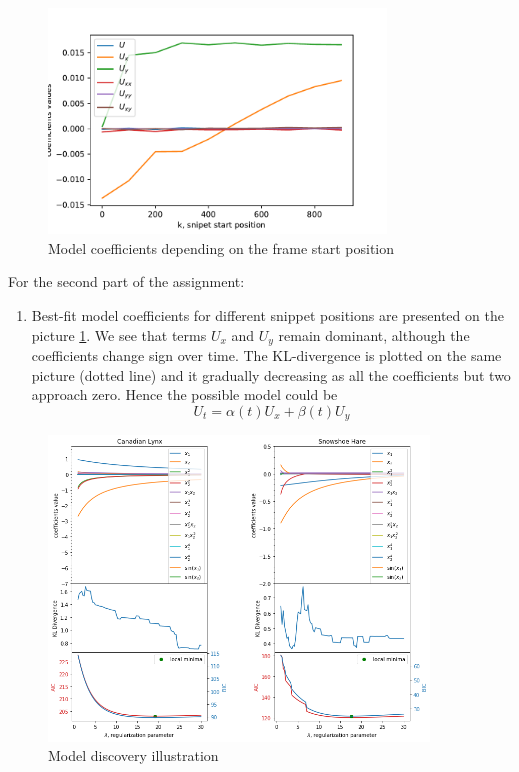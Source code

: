 \documentclass{article}
\begin{document}
    \begin{figure}
        \centering
        \includegraphics[width=0.8\textwidth]{images/video_coefs.pdf}
        \caption{\label{fig:video_results}Model coefficients depending on the frame start position}
    \end{figure}
    For the second part of the assignment:
    \begin{enumerate}
        \item Best-fit model coefficients for different snippet positions are presented on the picture \ref{fig:video_results}. We see that terms $U_{x}$ and $U_{y}$ remain dominant, although the coefficients change sign over time. The KL-divergence is plotted on the same picture (dotted line) and it gradually decreasing as all the coefficients but two approach zero. Hence the possible model could be
            \[
                U_t = \alpha(t)U_x + \beta(t)U_y
            \]
    \end{enumerate}
    
\begin{figure}[h!]
    \centering
    \includegraphics[width=0.9\textwidth]{images/lynx_results.png}
    \caption{\label{fig:lynx_results}
Model discovery illustration}
\end{figure}
\end{document}
